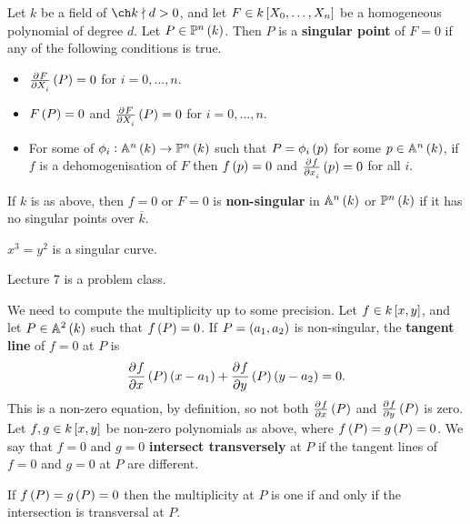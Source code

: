 \begin{definition}
Let $ k $ be a field of $ \ch k \nmid d > 0 $, and let $ F \in k\sbr{X_0, \dots, X_n} $ be a homogeneous polynomial of degree $ d $. Let $ P \in \PP^n\br{k} $. Then $ P $ is a \textbf{singular point} of $ F = 0 $ if any of the following conditions is true.
\begin{itemize}
\item $ \tpd{F}{X_i}\br{P} = 0 $ for $ i = 0, \dots, n $.
\item $ F\br{P} = 0 $ and $ \tpd{F}{X_i}\br{P} = 0 $ for $ i = 0, \dots, n $.
\item For some of $ \phi_i : \AA^n\br{k} \to \PP^n\br{k} $ such that $ P = \phi_i\br{p} $ for some $ p \in \AA^n\br{k} $, if $ f $ is a dehomogenisation of $ F $ then $ f\br{p} = 0 $ and $ \tpd{f}{x_i}\br{p} = 0 $ for all $ i $.
\end{itemize}
\end{definition}

\begin{definition}
If $ k $ is as above, then $ f = 0 $ or $ F = 0 $ is \textbf{non-singular} in $ \AA^n\br{k} $ or $ \PP^n\br{k} $ if it has no singular points over $ \overline{k} $.
\end{definition}

\begin{example*}
$ x^3 = y^2 $ is a singular curve.
\end{example*}


Lecture 7 is a problem class.


We need to compute the multiplicity up to some precision. Let $ f \in k\sbr{x, y} $, and let $ P \in \AA^2\br{k} $ such that $ f\br{P} = 0 $. If $ P = \br{a_1, a_2} $ is non-singular, the \textbf{tangent line} of $ f = 0 $ at $ P $ is
$$ \dpd{f}{x}\br{P}\br{x - a_1} + \dpd{f}{y}\br{P}\br{y - a_2} = 0. $$
This is a non-zero equation, by definition, so not both $ \tpd{f}{x}\br{P} $ and $ \tpd{f}{y}\br{P} $ is zero. Let $ f, g \in k\sbr{x, y} $ be non-zero polynomials as above, where $ f\br{P} = g\br{P} = 0 $. We say that $ f = 0 $ and $ g = 0 $ \textbf{intersect transversely} at $ P $ if the tangent lines of $ f = 0 $ and $ g = 0 $ at $ P $ are different.

\begin{theorem}
If $ f\br{P} = g\br{P} = 0 $ then the multiplicity at $ P $ is one if and only if the intersection is transversal at $ P $.
\end{theorem}

